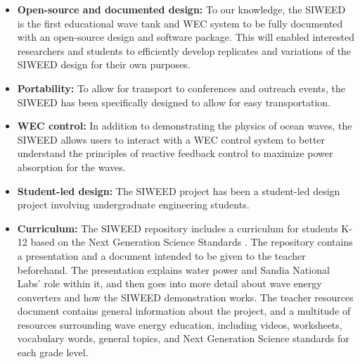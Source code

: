 \documentclass[11pt, letterpaper]{article}
\begin{document}
\begin{itemize}
  \item \textbf{Open-source and documented design:} To our knowledge, the SIWEED is the first educational wave tank and WEC system to be fully documented with an open-source design and software package.
  This will enabled interested researchers and students to efficiently develop replicates and variations of the SIWEED design for their own purposes.
  \item \textbf{Portability:} To allow for transport to conferences and outreach events, the SIWEED has been specifically designed to allow for easy transportation.
  \item \textbf{WEC control:} In addition to demonstrating the physics of ocean waves, the SIWEED allows users to interact with a WEC control system to better understand the principles of reactive feedback control to maximize power absorption for the waves.
  \item \textbf{Student-led design:} The SIWEED project has been a student-led design project involving undergraduate engineering students.
  \item \textbf{Curriculum:} The SIWEED repository includes a curriculum for students K-12 based on the Next Generation Science Standards \cite{NextGenScience2021}. 
The repository contains a presentation and a document intended to be given to the teacher beforehand. 
The presentation explains water power and Sandia National Labs' role within it, and then goes into more detail about wave energy converters and how the SIWEED demonstration works.
The teacher resources document contains general information about the project, and a multitude of resources surrounding wave energy education, including videos, worksheets, vocabulary words, general topics, and Next Generation Science standards for each grade level.
\end{itemize}
\end{document}
